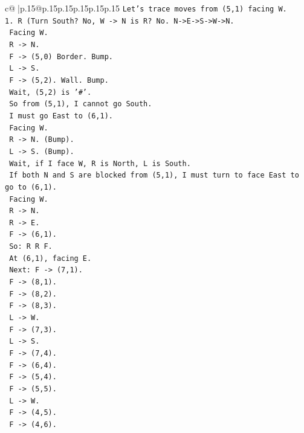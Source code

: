 \documentclass{article}
\begin{document}
{\begin{supertabular}{c@{$\;$}|p{.15\linewidth}@{}p{.15\linewidth}p{.15\linewidth}p{.15\linewidth}p{.15\linewidth}p{.15\linewidth}}
{{{\texttt{Let's trace moves from (5,1) facing W.} \\
\texttt{1. R (Turn South? No, W {-}> N is R? No. N{-}>E{-}>S{-}>W{-}>N.} \\
\texttt{   Facing W.} \\
\texttt{   R {-}> N.} \\
\texttt{   F {-}> (5,0) Border. Bump.} \\
\texttt{   L {-}> S.} \\
\texttt{   F {-}> (5,2). Wall. Bump.} \\
\texttt{   Wait, (5,2) is '\#'.} \\
\texttt{   So from (5,1), I cannot go South.} \\
\texttt{   I must go East to (6,1).} \\
\texttt{   Facing W.} \\
\texttt{   R {-}> N. (Bump).} \\
\texttt{   L {-}> S. (Bump).} \\
\texttt{   Wait, if I face W, R is North, L is South.} \\
\texttt{   If both N and S are blocked from (5,1), I must turn to face East to go to (6,1).} \\
\texttt{   Facing W.} \\
\texttt{   R {-}> N.} \\
\texttt{   R {-}> E.} \\
\texttt{   F {-}> (6,1).} \\
\texttt{   So: R R F.} \\
\texttt{   At (6,1), facing E.} \\
\texttt{   Next: F {-}> (7,1).} \\
\texttt{   F {-}> (8,1).} \\
\texttt{   F {-}> (8,2).} \\
\texttt{   F {-}> (8,3).} \\
\texttt{   L {-}> W.} \\
\texttt{   F {-}> (7,3).} \\
\texttt{   L {-}> S.} \\
\texttt{   F {-}> (7,4).} \\
\texttt{   F {-}> (6,4).} \\
\texttt{   F {-}> (5,4).} \\
\texttt{   F {-}> (5,5).} \\
\texttt{   L {-}> W.} \\
\texttt{   F {-}> (4,5).} \\
\texttt{   F {-}> (4,6).} \\
}}}
\end{supertabular}}
\end{document}
